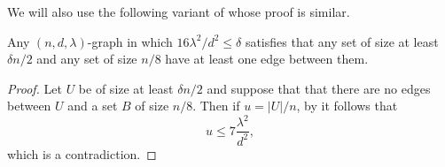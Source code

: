 \documentclass{toc}
\begin{document}
We will also use the following variant of  whose proof is similar. 

\begin{lemma} \label{lem:good_expanders2} 
Any $(n,d,\lambda)$-graph
in which $16 {\lambda^2}/{d^2} \leq \delta$ satisfies that 
%
%
any set of size at least $\delta n / 2$ and any set of size $n/8$ have at least one edge between them.
%
%
%
\end{lemma} 

\begin{proof}
Let $U$ be of size at least $\delta n/2$ and suppose that that there are no edges between 
$U$ and a set $B$ of size $n/8$. Then if $u = |U|/n$, by  it follows that 
\[
u \leq 7 \frac{\lambda^2}{d^2},
\]
which is a contradiction. 

%
%
%
%
%
%
%
%
\end{proof} 
\end{document}
